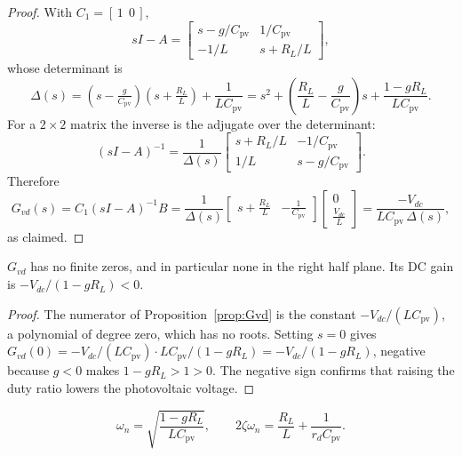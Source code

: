 \begin{proof}
With $C_1 = [\,1\ \ 0\,]$,
\[
sI - A = \begin{bmatrix} s - g/C_{\mathrm{pv}} & 1/C_{\mathrm{pv}} \\ -1/L & s + R_L/L \end{bmatrix},
\]
whose determinant is
\[
\Delta(s) = \left(s - \tfrac{g}{C_{\mathrm{pv}}}\right)\left(s + \tfrac{R_L}{L}\right) + \frac{1}{LC_{\mathrm{pv}}}
= s^2 + \left(\frac{R_L}{L} - \frac{g}{C_{\mathrm{pv}}}\right)s + \frac{1 - gR_L}{LC_{\mathrm{pv}}} .
\]
For a $2\times 2$ matrix the inverse is the adjugate over the determinant:
\[
(sI-A)^{-1} = \frac{1}{\Delta(s)}\begin{bmatrix} s + R_L/L & -1/C_{\mathrm{pv}} \\ 1/L & s - g/C_{\mathrm{pv}}\end{bmatrix}.
\]
Therefore
\[
G_{vd}(s) = C_1 (sI-A)^{-1} B
= \frac{1}{\Delta(s)}\begin{bmatrix} s + \tfrac{R_L}{L} & -\tfrac{1}{C_{\mathrm{pv}}}\end{bmatrix}
\begin{bmatrix} 0 \\ \tfrac{V_{dc}}{L}\end{bmatrix}
= \frac{-V_{dc}}{L C_{\mathrm{pv}}\,\Delta(s)} ,
\]
as claimed.
\end{proof}

\begin{corollary}
\label{cor:nozero}
$G_{vd}$ has no finite zeros, and in particular none in the right half plane.
Its DC gain is $-V_{dc}/(1 - gR_L) < 0$.
\end{corollary}

\begin{proof}
The numerator of Proposition~\ref{prop:Gvd} is the constant
$-V_{dc}/(LC_{\mathrm{pv}})$, a polynomial of degree zero, which has no roots.
Setting $s = 0$ gives
$G_{vd}(0) = -V_{dc}/(LC_{\mathrm{pv}}) \cdot LC_{\mathrm{pv}}/(1-gR_L)
= -V_{dc}/(1-gR_L)$, negative because $g < 0$ makes $1 - gR_L > 1 > 0$. The
negative sign confirms that raising the duty ratio lowers the photovoltaic
voltage.
\end{proof}

\begin{proposition}
\label{prop:modal}
\[
\omega_n = \sqrt{\frac{1 - gR_L}{LC_{\mathrm{pv}}}},
\qquad
2\zeta\omega_n = \frac{R_L}{L} + \frac{1}{r_d C_{\mathrm{pv}}} .
\]
\end{proposition}


